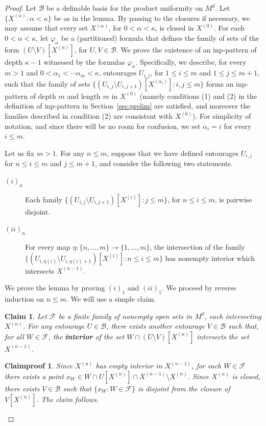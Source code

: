 \documentclass[10pt,a4paper]{amsart}
\newtheorem{claim}{Claim}
\newtheorem{claimproof}{Claimproof}
\newcommand{\BU}{\Bb} %
\newcommand{\Bb}{\mathcal{B}}
\newcommand{\Ff}{\mathcal{F}}
\newcommand{\X}[1]{X^{(#1)}}
\begin{document}
\begin{proof}
Let $\BU$ be a definable basis for the product uniformity on $M^d$. Let $\{ \X{\alpha} : \alpha < \kappa\}$ be as in the lemma. By passing to the closures if necessary, we may assume that every set $\X{\alpha}$, for $0<\alpha<\kappa$, is closed in $\X{0}$. For each $0<\alpha<\kappa$, let $\varphi_\alpha$ be a (partitioned) formula that defines the family of sets of the form $(U\setminus V)[\X{\alpha}]$, for $U,V\in \BU$. We prove the existence of an inp-pattern of depth $\kappa-1$ witnessed by the formulas $\varphi_\alpha$. Specifically, we describe, for every $m>1$ and $0<\alpha_1<\cdots\alpha_m < \kappa$, entourages $U_{i,j}$, for $1\leq i\leq m$ and $1\leq j\leq m+1$, such that the family of sets $\{ (U_{i,j} \setminus U_{i,j+1})[\X{\alpha_i}] : i, j\leq m\}$ forms an inp-pattern of depth $m$ and length $m$ in $\X{0}$ (namely conditions (1) and (2) in the definition of inp-pattern in Section~\ref{sec:prelim} are satisfied, and moreover the families described in condition (2) are consistent with $\X{0}$). For simplicity of notation, and since there will be no room for confusion, we set $\alpha_i=i$ for every $i\leq m$.

Let us fix $m>1$. For any $n\leq m$, suppose that we have defined entourages $U_{i,j}$ for $n\leq i \leq m$ and $j\leq m+1$, and consider the following two statements.
\begin{description}
    \item[$(i)_n$] Each family $\{ (U_{i,j} \setminus U_{i,j+1})[\X{i}] : j\leq m\}$, for $n\leq i\leq m$, is pairwise disjoint. 
    \item[$(ii)_n$] For every map $\eta:\{n,\ldots, m\}\rightarrow \{1,\ldots, m\}$, the intersection of the family $\{ (U_{i,\eta(i)} \setminus U_{i,\eta(i)+1})[\X{i}] : n\leq i\leq m \}$ has nonempty interior which intersects $\X{n-1}$.
\end{description}
We prove the lemma by proving $(i)_1$ and $(ii)_1$. We proceed by reverse induction on $n\leq m$. We will use a simple claim. 

\begin{claim}\label{claim:UV}
Let $\Ff$ be a finite family of nonempty open sets in $M^d$, each intersecting $\X{n}$. For any entourage $U\in \BU$, there exists another entourage $V\in \BU$ such that, for all $W\in \Ff$, the \textbf{interior} of the set $W \cap (U\setminus V)[\X{n}]$ intersects the set $\X{n-1}$.
\end{claim}
\begin{claimproof}
Since $\X{n}$ has empty interior in $\X{n-1}$, for each $W\in \Ff$ there exists a point $x_W \in W\cap U[\X{n}] \cap  \X{n-1} \setminus \X{n}$. Since $\X{n}$ is closed, there exists $V \in \BU$ such that $\{x_W : W\in \Ff\}$ is disjoint from the closure of $V[\X{n}]$. The claim follows. 
\end{claimproof}


\end{proof}
\end{document}

